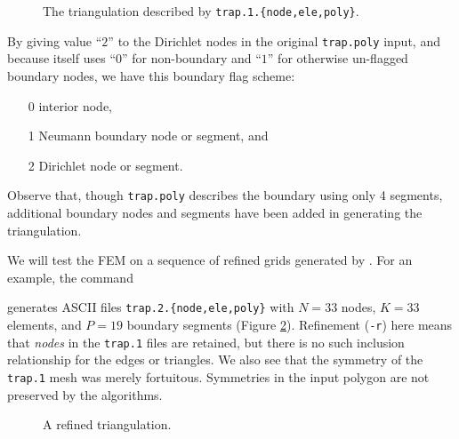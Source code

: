 \begin{figure}

\caption{The triangulation described by \texttt{trap.1.\{node,ele,poly\}}.}
\label{fig:un:trapone}
\end{figure}

By giving value ``$2$'' to the Dirichlet nodes in the original \texttt{trap.poly} input, and because \Triangle itself uses ``$0$'' for non-boundary and ``$1$'' for otherwise un-flagged boundary nodes, we have this boundary flag scheme:
\begin{itemize}
\item[0] interior node,
\item[1] Neumann boundary node or segment, and
\item[2] Dirichlet node or segment.
\end{itemize}
Observe that, though \texttt{trap.poly} describes the boundary using only 4 segments, additional boundary nodes and segments have been added in generating the triangulation.




We will test the FEM on a sequence of refined grids generated by \Triangle.  For an example, the command
generates ASCII files \texttt{trap.2.\{node,ele,poly\}} with $N=33$ nodes, $K=33$ elements, and $P=19$ boundary segments (Figure \ref{fig:un:traptwo}).  Refinement (\texttt{-r}) here means that \emph{nodes} in the \texttt{trap.1} files are retained, but there is no such inclusion relationship for the edges or triangles.  We also see that the symmetry of the \texttt{trap.1} mesh was merely fortuitous.  Symmetries in the input polygon are not preserved by the \Triangle algorithms.

\begin{figure}

\caption{A refined triangulation.}
\label{fig:un:traptwo}
\end{figure}

